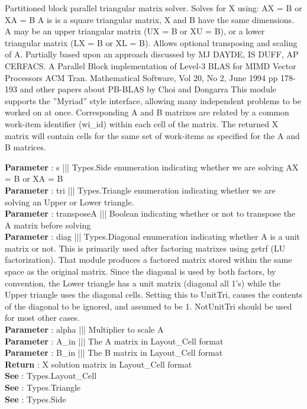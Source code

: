 \par
Partitioned block parallel triangular matrix solver. Solves for X using: AX = B or XA = B A is is a square triangular matrix, X and B have the same dimensions. A may be an upper triangular matrix (UX = B or XU = B), or a lower triangular matrix (LX = B or XL = B). Allows optional transposing and scaling of A. Partially based upon an approach discussed by MJ DAYDE, IS DUFF, AP CERFACS. A Parallel Block implementation of Level-3 BLAS for MIMD Vector Processors ACM Tran. Mathematical Software, Vol 20, No 2, June 1994 pp 178-193 and other papers about PB-BLAS by Choi and Dongarra This module supports the ''Myriad'' style interface, allowing many independent problems to be worked on at once. Corresponding A and B matrixes are related by a common work-item identifier (wi\_id) within each cell of the matrix. The returned X matrix will contain cells for the same set of work-items as specified for the A and B matrices.
\par
\textbf{Parameter} : s ||| Types.Side enumeration indicating whether we are solving AX = B or XA = B \\
\textbf{Parameter} : tri ||| Types.Triangle enumeration indicating whether we are solving an Upper or Lower triangle. \\
\textbf{Parameter} : transposeA ||| Boolean indicating whether or not to transpose the A matrix before solving \\
\textbf{Parameter} : diag ||| Types.Diagonal enumeration indicating whether A is a unit matrix or not. This is primarily used after factoring matrixes using getrf (LU factorization). That module produces a factored matrix stored within the same space as the original matrix. Since the diagonal is used by both factors, by convention, the Lower triangle has a unit matrix (diagonal all 1's) while the Upper triangle uses the diagonal cells. Setting this to UnitTri, causes the contents of the diagonal to be ignored, and assumed to be 1. NotUnitTri should be used for most other cases. \\
\textbf{Parameter} : alpha ||| Multiplier to scale A \\
\textbf{Parameter} : A\_in ||| The A matrix in Layout\_Cell format \\
\textbf{Parameter} : B\_in ||| The B matrix in Layout\_Cell format \\
\textbf{Return} : X solution matrix in Layout\_Cell format \\
\textbf{See} : Types.Layout\_Cell \\
\textbf{See} : Types.Triangle \\
\textbf{See} : Types.Side \\
